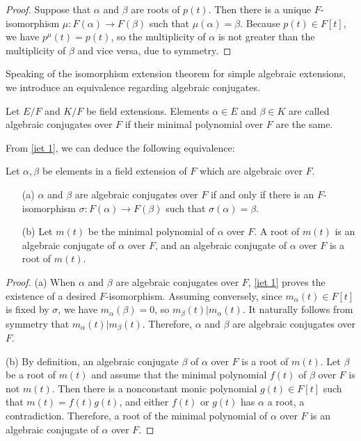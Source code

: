\begin{proof}
    Suppose that $\alpha$ and $\beta$ are roots of $p(t)$.
    Then there is a unique $F$-isomorphism $\mu: F(\alpha)\rightarrow F(\beta)$ such that $\mu(\alpha)=\beta$.
    Because $p(t)\in F[t]$, we have $p^\mu(t)=p(t)$, so the multiplicity of $\alpha$ is not greater than the multiplicity of $\beta$ and vice versa, due to symmetry.
\end{proof}
Speaking of the isomorphism extension theorem for simple algebraic extensions, we introduce an equivalence regarding algebraic conjugates.
\begin{defi}
    Let $E/F$ and $K/F$ be field extensions.
    Elements $\alpha\in E$ and $\beta\in K$ are called algebraic conjugates over $F$ if their minimal polynomial over $F$ are the same.
\end{defi}
From \cref{iet 1}, we can deduce the following equivalence:
\begin{obs}
    Let $\alpha, \beta$ be elements in a field extension of $F$ which are algebraic over $F$.
    \begin{enumerate}
        \item[(a)]
        {
            $\alpha$ and $\beta$ are algebraic conjugates over $F$ if and only if there is an $F$-isomorphism $\sigma: F(\alpha)\rightarrow F(\beta)$ such that $\sigma(\alpha)=\beta$.        
        }
        \item[(b)]
        {
            Let $m(t)$ be the minimal polynomial of $\alpha$ over $F$.
            A root of $m(t)$ is an algebraic conjugate of $\alpha$ over $F$, and an algebraic conjugate of $\alpha$ over $F$ is a root of $m(t)$.
        }
    \end{enumerate}
\end{obs}
\begin{proof}
    \hangindent=0.65cm
    \noindent(a)
    When $\alpha$ and $\beta$ are algebraic conjugates over $F$, \cref{iet 1} proves the existence of a desired $F$-isomorphism.
    Assuming conversely, since $m_\alpha(t)\in F[t]$ is fixed by $\sigma$, we have $m_\alpha(\beta)=0$, so $m_\beta(t)|m_\alpha(t)$.
    It naturally follows from symmetry that $m_\alpha(t)|m_\beta(t)$.
    Therefore, $\alpha$ and $\beta$ are algebraic conjugates over $F$.

    \noindent(b)
    By definition, an algebraic conjugate $\beta$ of $\alpha$ over $F$ is a root of $m(t)$.
    Let $\beta$ be a root of $m(t)$ and assume that the minimal polynomial $f(t)$ of $\beta$ over $F$ is not $m(t)$.
    Then there is a nonconstant monic polynomial $g(t)\in F[t]$ such that $m(t)=f(t)g(t)$, and either $f(t)$ or $g(t)$ has $\alpha$ a root, a contradiction.
    Therefore, a root of the minimal polynomial of $\alpha$ over $F$ is an algebraic conjugate of $\alpha$ over $F$.
\end{proof}
